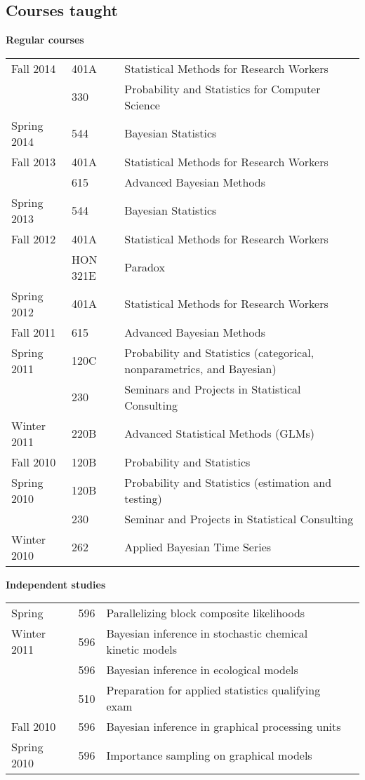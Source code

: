\documentclass[overlapped,line]{res}
\begin{document}
\begin{resume}


\section{\bf Courses taught}
\vspace{0.1in}

{\bf Regular courses}

\begin{tabular}{lll}
Fall 2014 & 401A & Statistical Methods for Research Workers \\
& 330 & Probability and Statistics for Computer Science \\
Spring 2014 & 544 & Bayesian Statistics \\
Fall 2013 & 401A & Statistical Methods for Research Workers \\
& 615 & Advanced Bayesian Methods \\
Spring 2013 & 544 & Bayesian Statistics \\
Fall 2012 & 401A & Statistical Methods for Research Workers \\
 & HON 321E & Paradox \\
Spring 2012 & 401A & Statistical Methods for Research Workers \\
Fall 2011 & 615 & Advanced Bayesian Methods \\
\hline
Spring 2011 & 120C & Probability and Statistics (categorical, nonparametrics, and Bayesian) \\
& 230 & Seminars and Projects in Statistical Consulting \\
Winter 2011 & 220B & Advanced Statistical Methods (GLMs) \\
Fall 2010  & 120B & Probability and Statistics \\
Spring 2010 & 120B & Probability and Statistics (estimation and testing) \\
 & 230 & Seminar and Projects in Statistical Consulting \\
Winter 2010 & 262 & Applied Bayesian Time Series
\end{tabular}

{\bf Independent studies}

\begin{tabular}{llll}
Spring & 596 & Parallelizing block composite likelihoods \\
Winter 2011 & 596 & Bayesian inference in stochastic chemical kinetic models \\
& 596 & Bayesian inference in ecological models \\
& 510 & Preparation for applied statistics qualifying exam \\
Fall 2010 & 596 & Bayesian inference in graphical processing units \\
Spring 2010 & 596 & Importance sampling on graphical models
\end{tabular}


\end{resume}
\end{document}
